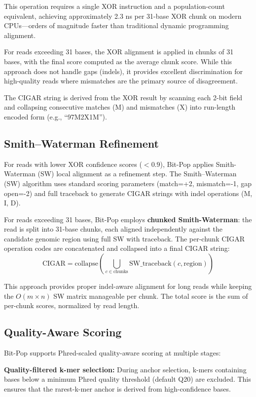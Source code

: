 \documentclass[utf8]{article}
\begin{document}
This operation requires a single XOR instruction and a population-count equivalent, achieving approximately 2.3 ns per 31-base XOR chunk on modern CPUs---orders of magnitude faster than traditional dynamic programming alignment.

For reads exceeding 31 bases, the XOR alignment is applied in chunks of 31 bases, with the final score computed as the average chunk score. While this approach does not handle gaps (indels), it provides excellent discrimination for high-quality reads where mismatches are the primary source of disagreement.

The CIGAR string is derived from the XOR result by scanning each 2-bit field and collapsing consecutive matches (M) and mismatches (X) into run-length encoded form (e.g., ``97M2X1M'').

\subsection{Smith--Waterman Refinement}

For reads with lower XOR confidence scores ($< 0.9$), Bit-Pop applies Smith-Waterman (SW) local alignment as a refinement step. The Smith--Waterman (SW) algorithm \citep{smith1981} uses standard scoring parameters (match=+2, mismatch=-1, gap open=-2) and full traceback to generate CIGAR strings with indel operations (M, I, D).

For reads exceeding 31 bases, Bit-Pop employs \textbf{chunked Smith-Waterman}: the read is split into 31-base chunks, each aligned independently against the candidate genomic region using full SW with traceback. The per-chunk CIGAR operation codes are concatenated and collapsed into a final CIGAR string:
\[
\text{CIGAR} = \text{collapse}\left(\bigcup_{c \in \text{chunks}} \text{SW\_traceback}(c, \text{region})\right)
\]

This approach provides proper indel-aware alignment for long reads while keeping the $O(m \times n)$ SW matrix manageable per chunk. The total score is the sum of per-chunk scores, normalized by read length.

\subsection{Quality-Aware Scoring}

Bit-Pop supports Phred-scaled quality-aware scoring at multiple stages:

\textbf{Quality-filtered k-mer selection:} During anchor selection, k-mers containing bases below a minimum Phred quality threshold (default Q20) \citep{edlin1998} are excluded. This ensures that the rarest-k-mer anchor is derived from high-confidence bases.
\end{document}
